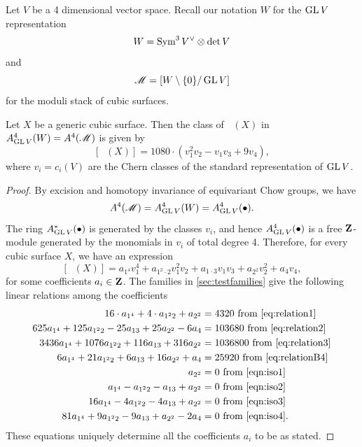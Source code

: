 \documentclass[12pt,reqno]{amsart}
\DeclareMathOperator{\Orb}{\overline{Orb}}
\numberwithin{equation}{section}
\begin{document}
Let $V$ be a 4 dimensional vector space.
Recall our notation $W$ for the $\operatorname{GL} V$ representation 
\[W = \operatorname{Sym}^3V^\vee \otimes \det V\]
and
\[\mathscr M = \left[ W \setminus \{0\} / \operatorname{GL} V \right]\]
for the moduli stack of cubic surfaces.
\begin{theorem}\label{thm:eqvclass}
  Let $X$ be a generic cubic surface.
  Then the class of $\Orb(X)$ in $A^4_{\operatorname{GL} V}(W) = A^4(\mathscr M)$ is given by
  \[
    [\Orb(X)] = 1080 \cdot \left(v_{1}^{2}v_{2} - v_{1}v_{3}+ 9v_{4}\right),
  \]
  where $v_i = c_i(V)$ are the Chern classes of the standard representation of $\operatorname{GL} V$.
\end{theorem}
\begin{proof}
  By excision and homotopy invariance of equivariant Chow groups, we have
  \[ A^4(\mathscr M) = A^4_{\operatorname{GL} V}(W) = A^4_{\operatorname{GL} V}(\bullet).\]
  The ring $A^*_{\operatorname{GL} V}(\bullet)$ is generated by the classes $v_i$, and hence $A^4_{\operatorname{GL} V}(\bullet)$ is a free ${\bf Z}$-module generated by the monomials in $v_i$ of total degree 4.
  Therefore, for every cubic surface $X$, we have an expression
  \[[\Orb(X)] = a_{1^4}v_1^4 + a_{1^2\cdot 2} v_1^2v_2 + a_{1\cdot 3} v_1v_3 + a_{2^2}v_2^2 + a_4 v_4,\]
  for some coefficients $a_i \in {\bf Z}$.
  The families in \autoref{sec:testfamilies} give the following linear relations among the coefficients
  \begin{align*}
    16 \cdot a_{1^4} + 4 \cdot a_{1^2 2} + a_{2^2} &= 4320 \text{ from \eqref{eq:relation1}}\\
    625 a_{1^{4}} + 125 a_{1^{2}2} - 25a_{13} + 25a_{2^2} - 6 a_{4} &= 103680 \text{ from \eqref{eq:relation2}}\\
    3436a_{1^4} + 1076 a_{1^{2}2} +116 a_{13} + 316 a_{2^2} &= 1036800 \text{ from \eqref{eq:relation3}}\\
    6a_{1^{4}} + 21a_{1^{2}2}+6a_{13}+16a_{2^{2}}+a_{4} &= 25920 \text{ from \eqref{eq:relationB4}}\\
    a_{2^2} &= 0  \text{ from \eqref{eqn:iso1}}\\
    a_{1^4} - a_{1^2 2}- a_{13} +  a_{2^2}  &= 0  \text{ from \eqref{eqn:iso2}}\\
    16a_{1^4} -4a_{1^2 2}- 4a_{13} +  a_{2^2}  &= 0  \text{ from \eqref{eqn:iso3}}\\
    81a_{1^4} +9a_{1^2 2}- 9a_{13} +  a_{2^2}-2a_4  &= 0  \text{ from \eqref{eqn:iso4}}.
  \end{align*}
  These equations uniquely determine all the coefficients $a_i$ to be as stated.
\end{proof}
\end{document}
